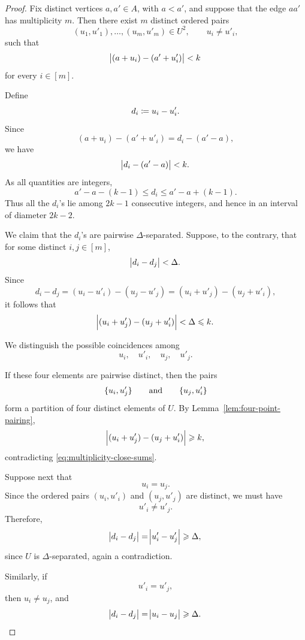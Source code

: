 \documentclass[reqno,a4paper,12pt]{amsart}
\begin{document}
\begin{proof}
    Fix distinct vertices \(a,a'\in A\), with \(a<a'\), and suppose
    that the edge \(aa'\) has multiplicity \(m\). Then there exist
    \(m\) distinct ordered pairs
    \[
        (u_1,u'_1),\dotsc,(u_m,u'_m)\in U^2,
        \qquad
        u_i\neq u'_i,
    \]
    such that
    \[
        \abs{(a+u_i)-(a'+u'_i)}<k
    \]
    for every \(i\in[m]\).

    Define
    \[
        d_i\mathrel{\coloneqq} u_i-u'_i.
    \]
    Since
    \[
        (a+u_i)-(a'+u'_i)
        =
        d_i-(a'-a),
    \]
    we have
    \[
        \abs{d_i-(a'-a)}<k.
    \]
    As all quantities are integers,
    \[
        a'-a-(k-1)
        \leq
        d_i
        \leq
        a'-a+(k-1).
    \]
    Thus all the \(d_i\)'s lie among \(2k-1\) consecutive integers,
    and hence in an interval of diameter \(2k-2\).

    We claim that the \(d_i\)'s are pairwise
    \(\Delta\)-separated. Suppose, to the contrary, that for some
    distinct \(i,j\in[m]\),
    \[
        \abs{d_i-d_j}<\Delta.
    \]
    Since
    \[
        d_i-d_j
        =
        (u_i-u'_i)-(u_j-u'_j)
        =
        (u_i+u'_j)-(u_j+u'_i),
    \]
    it follows that
    \begin{equation}
        \label{eq:multiplicity-close-sums}
        \abs{(u_i+u'_j)-(u_j+u'_i)}
        <
        \Delta
        \leqslant k.
    \end{equation}

    We distinguish the possible coincidences among
    \[
        u_i,\quad u'_i,\quad u_j,\quad u'_j.
    \]

    If these four elements are pairwise distinct, then the pairs
    \[
        \lbrace u_i,u'_j\rbrace
        \qquad\text{and}\qquad
        \lbrace u_j,u'_i\rbrace
    \]
    form a partition of four distinct elements of \(U\). By
    Lemma~\ref{lem:four-point-pairing},
    \[
        \abs{(u_i+u'_j)-(u_j+u'_i)}
        \geqslant k,
    \]
    contradicting \eqref{eq:multiplicity-close-sums}.

    Suppose next that
    \[
        u_i=u_j.
    \]
    Since the ordered pairs
    \((u_i,u'_i)\) and \((u_j,u'_j)\) are distinct, we must have
    \[
        u'_i\neq u'_j.
    \]
    Therefore,
    \[
        \abs{d_i-d_j}
        =
        \abs{u'_i-u'_j}
        \geqslant\Delta,
    \]
    since \(U\) is \(\Delta\)-separated, again a contradiction.

    Similarly, if
    \[
        u'_i=u'_j,
    \]
    then \(u_i\neq u_j\), and
    \[
        \abs{d_i-d_j}
        =
        \abs{u_i-u_j}
        \geqslant\Delta.
    \]


\end{proof}
\end{document}

